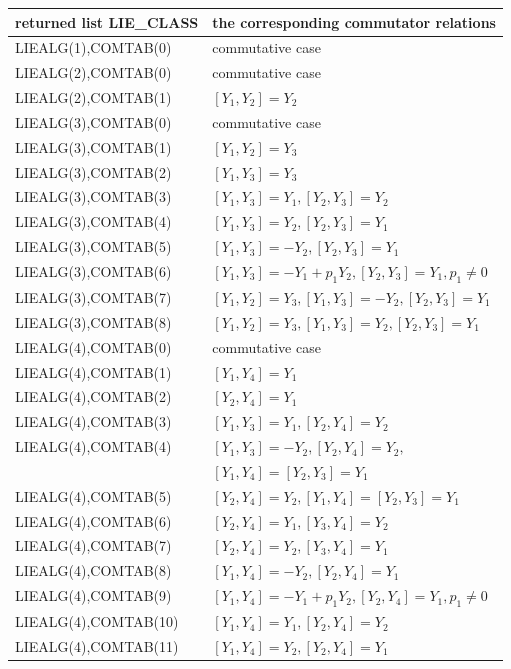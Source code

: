 \hspace*{0.3cm}\begin{tabular}{l|l}returned list LIE\_CLASS&
the corresponding commutator relations\\[0.1cm]\hline
{LIEALG(1),COMTAB(0)}&commutative case\\[0.1cm]\hline
{LIEALG(2),COMTAB(0)}&commutative case\\[0.1cm]
{LIEALG(2),COMTAB(1)}&$[Y_1,Y_2]=Y_2$\\[0.1cm]\hline
{LIEALG(3),COMTAB(0)}&commutative case\\[0.1cm]
{LIEALG(3),COMTAB(1)}&$[Y_1,Y_2]=Y_3$\\[0.1cm]
{LIEALG(3),COMTAB(2)}&$[Y_1,Y_3]=Y_3$\\[0.1cm]
{LIEALG(3),COMTAB(3)}&$[Y_1,Y_3]=Y_1,[Y_2,Y_3]=Y_2$\\[0.1cm]
{LIEALG(3),COMTAB(4)}&$[Y_1,Y_3]=Y_2,[Y_2,Y_3]=Y_1$\\[0.1cm]
{LIEALG(3),COMTAB(5)}&$[Y_1,Y_3]=-Y_2,[Y_2,Y_3]=Y_1$\\[0.1cm]
{LIEALG(3),COMTAB(6)}&$[Y_1,Y_3]=-Y_1+p_1 Y_2,[Y_2,Y_3]=Y_1,p_1\neq 0$\\[0.1cm]
{LIEALG(3),COMTAB(7)}&$[Y_1,Y_2]=Y_3,[Y_1,Y_3]=-Y_2,[Y_2,Y_3]=Y_1$\\[0.1cm]
{LIEALG(3),COMTAB(8)}&$[Y_1,Y_2]=Y_3,[Y_1,Y_3]=Y_2,[Y_2,Y_3]=Y_1$\\[0.1cm]\hline
{LIEALG(4),COMTAB(0)}&commutative case\\[0.1cm]
{LIEALG(4),COMTAB(1)}&$[Y_1,Y_4]=Y_1$\\[0.1cm]
{LIEALG(4),COMTAB(2)}&$[Y_2,Y_4]=Y_1$\\[0,1cm]
{LIEALG(4),COMTAB(3)}&$[Y_1,Y_3]=Y_1,[Y_2,Y_4]=Y_2$\\[0.1cm]
{LIEALG(4),COMTAB(4)}&$[Y_1,Y_3]=-Y_2,[Y_2,Y_4]=Y_2,$\\
                     &$[Y_1,Y_4]=[Y_2,Y_3]=Y_1$\\[0.1cm]
{LIEALG(4),COMTAB(5)}&$[Y_2,Y_4]=Y_2,[Y_1,Y_4]=[Y_2,Y_3]=Y_1$\\[0.1cm]
{LIEALG(4),COMTAB(6)}&$[Y_2,Y_4]=Y_1,[Y_3,Y_4]=Y_2$\\[0.1cm]
{LIEALG(4),COMTAB(7)}&$[Y_2,Y_4]=Y_2,[Y_3,Y_4]=Y_1$\\[0.1cm]
{LIEALG(4),COMTAB(8)}&$[Y_1,Y_4]=-Y_2,[Y_2,Y_4]=Y_1$\\[0.1cm]
{LIEALG(4),COMTAB(9)}&$[Y_1,Y_4]=-Y_1+p_1 Y_2,[Y_2,Y_4]=Y_1,p_1\neq 0$\\[0.1cm]
{LIEALG(4),COMTAB(10)}&$[Y_1,Y_4]=Y_1,[Y_2,Y_4]=Y_2$\\[0.1cm]
{LIEALG(4),COMTAB(11)}&$[Y_1,Y_4]=Y_2,[Y_2,Y_4]=Y_1$
\end{tabular}\\
